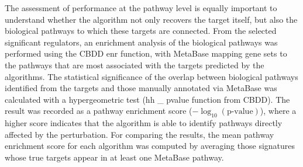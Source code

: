 The assessment of performance at the pathway level is equally important to understand whether the algorithm not only recovers the target itself, but also the biological pathways to which these targets are connected. From the selected significant regulators, an enrichment analysis of the biological pathways was performed using the \gls{CBDD} enr function, with MetaBase mapping gene sets to the pathways that are most associated with the targets predicted by the algorithms. The statistical significance of the overlap between biological pathways identified from the targets and those manually annotated via MetaBase was calculated with a hypergeometric test (hh \_ pvalue function from \gls{CBDD}). The result was recorded as a pathway enrichment score ($-\log_{10}(\text{p-value})$), where a higher score indicates that the algorithm is able to identify pathways directly affected by the perturbation. For comparing the results, the mean pathway enrichment score for each algorithm was computed by averaging those signatures whose true targets appear in at least one MetaBase pathway. 



